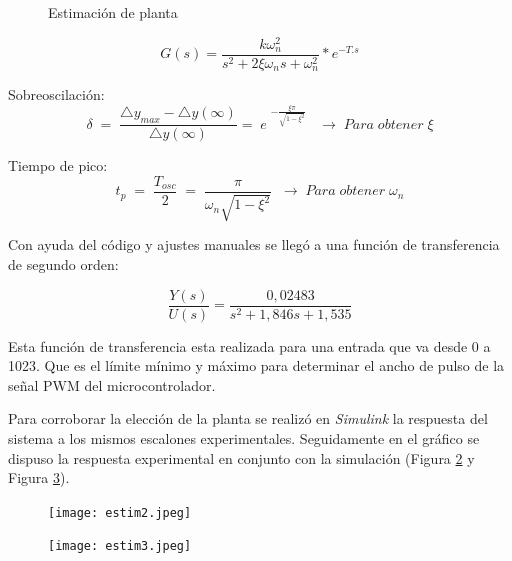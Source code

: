     \begin{figure}[htbp]
    	\centering
    	\caption{Estimación de planta} \label{fig:pl2}
    \end{figure}

 \begin{equation}
 	G(s)=\frac{k\omega_n^2}{s^2+2\xi\omega_ns+\omega_n^2}\ast e^{-T.s}
 \end{equation}

Sobreoscilación: 
\begin{equation}
	\delta\;=\;\frac{\triangle y_{max}-\triangle y\left(\infty\right)}{\triangle y\left(\infty\right)}=\;e\;^{-\frac{\xi\pi}{\sqrt{1-\xi^2}}}\;\;\;\rightarrow\;Para\;obtener\;\xi
\end{equation}

Tiempo de pico: 
\begin{equation}
t_p\;=\;\frac{T_{osc}}2\;=\;\frac\pi{\omega_n\sqrt{1-\xi^2}}\;\;\rightarrow\;Para\;obtener\;\omega_n
\end{equation}

    
    Con ayuda del código y ajustes manuales se llegó a una función de transferencia de segundo orden:
    
    \begin{equation}
    	\frac{Y(s)}{U(s)}=\frac{0,02483}{s^2+1,846s+1,535}
    \end{equation}
   
    Esta función de transferencia esta realizada para una entrada que va desde 0 a 1023. Que es el límite mínimo y máximo para determinar el ancho de pulso de la señal PWM del microcontrolador.
    
    Para corroborar la elección de la planta se realizó en \textit{Simulink} la respuesta del sistema a los mismos escalones experimentales. Seguidamente en el gráfico se dispuso la respuesta experimental en conjunto con la simulación (Figura \ref{fig:estim2} y Figura \ref{fig:estim3}).
    
    \begin{figure}[H]
    	\centering
    	\texttt{[image: estim2.jpeg]}
    	\label{fig:estim2}
    \end{figure}

\begin{figure}[H]
	\centering
	\texttt{[image: estim3.jpeg]}
	\label{fig:estim3}
\end{figure}
       
